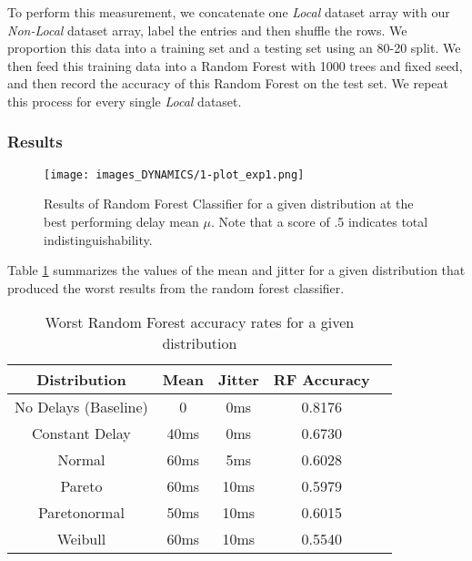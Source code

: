 To perform this measurement, we concatenate one \textit{Local} dataset array with our \textit{Non-Local} dataset array, label the entries and then shuffle the rows. We proportion this data into a training set and a testing set using an 80-20 split. We then feed this training data into a Random Forest with 1000 trees and fixed seed, and then record the accuracy of this Random Forest on the test set. We repeat this process for every single \textit{Local} dataset.

\subsubsection*{Results}


\begin{figure}
\captionsetup{justification=centering}
\centering
\texttt{[image: images\_DYNAMICS/1-plot\_exp1.png]}
\caption{Results of Random Forest Classifier for a given distribution at the best performing delay mean $\mu$. Note that a score of .5 indicates total indistinguishability.}
\label{figD:rf_graph}
\end{figure}

Table \ref{tabD:results-iat_rf} summarizes the values of the mean and jitter for a given distribution that produced the worst results from the random forest classifier.


\begin{table}[ht!]
\begin{center}
\begin{small}
\begin{sc}
\begin{tabular}{ccccc}
\hline
Distribution & Mean & Jitter & RF Accuracy\\
\hline
No Delays (Baseline) & 0 & 0ms & 0.8176 \\
Constant Delay & 40ms & 0ms & 0.6730 \\
Normal & 60ms & 5ms & 0.6028 \\
Pareto & 60ms & 10ms & 0.5979 \\
Paretonormal & 50ms & 10ms & 0.6015 \\
Weibull & 60ms & 10ms & 0.5540 \\
\hline
\end{tabular}
\end{sc}
\end{small}
\caption{Worst Random Forest accuracy rates for a given distribution}
\label{tabD:results-iat_rf}
\end{center}
\vskip -4mm
\end{table}

